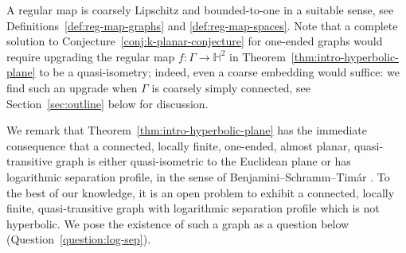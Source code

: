 \documentclass[11pt,a4paper]{amsart}
\newtheorem{alphtheorem}{Theorem}
\theoremstyle{definition}
\begin{document}
A regular map is coarsely Lipschitz and bounded-to-one in a suitable sense, see Definitions~\ref{def:reg-map-graphs} and \ref{def:reg-map-spaces}.  
Note that a complete solution to Conjecture~\ref{conj:k-planar-conjecture} for one-ended graphs would require upgrading the regular map $f : \Gamma \to \mathbb H^2$ in Theorem~\ref{thm:intro-hyperbolic-plane} to be a quasi-isometry; indeed, even a coarse embedding would suffice: we find such an upgrade when $\Gamma$ is coarsely simply connected, see Section~\ref{sec:outline} below for discussion. 

We remark that Theorem~\ref{thm:intro-hyperbolic-plane} has the immediate consequence that a connected, locally finite, one-ended, almost planar, quasi-transitive graph is either quasi-isometric to the Euclidean plane or has logarithmic separation profile, in the sense of Benjamini--Schramm--Tim\'ar \cite{benjamini2012separation}. 
To the best of our knowledge, it is an open problem to exhibit a connected, locally finite, quasi-transitive graph with logarithmic separation profile which is not hyperbolic. We pose the existence of such a graph as a question below (Question~\ref{question:log-sep}). 

% 
% 
% 
% 
\end{document}
